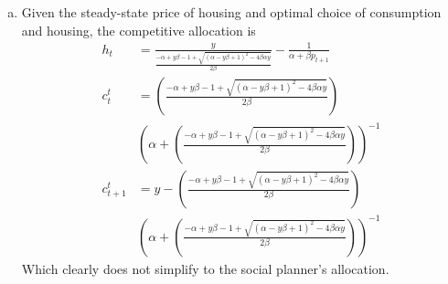 \documentclass{article}
\begin{document}
\begin{enumerate}
\begin{enumerate}[(a)]
			\item Given the steady-state price of housing and optimal choice of consumption and housing, the competitive allocation is
				\begin{align*}
					h_t		&= \frac{y}{\frac{-\alpha+y\beta - 1 +\sqrt{(\alpha-y\beta + 1)^2-4\beta\alpha y}}{2\beta}} - \frac{1}{\alpha + \beta p_{t+1}}	\\
					c_t^t &= \left(\frac{-\alpha+y\beta - 1 +\sqrt{(\alpha-y\beta + 1)^2-4\beta\alpha y}}{2\beta}\right)	\\
									&\left(\alpha + \left(\frac{-\alpha+y\beta - 1 +\sqrt{(\alpha-y\beta + 1)^2-4\beta\alpha y}}{2\beta}\right)\right)^{-1} \\
					c_{t+1}^t &=  y - \left(\frac{-\alpha+y\beta - 1 +\sqrt{(\alpha-y\beta + 1)^2-4\beta\alpha y}}{2\beta}\right)	\\
									&\left(\alpha + \left(\frac{-\alpha+y\beta - 1 +\sqrt{(\alpha-y\beta + 1)^2-4\beta\alpha y}}{2\beta}\right)\right)^{-1}
				\end{align*}
				Which clearly does not simplify to the social planner's allocation.
		\end{enumerate}

\end{enumerate}


\end{document}
